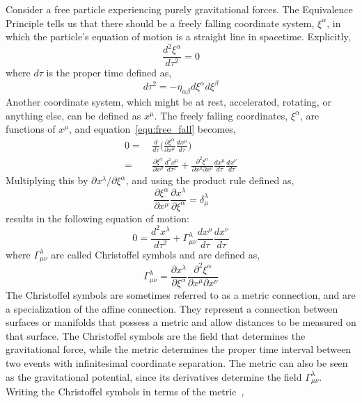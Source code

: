 Consider a free particle experiencing purely gravitational forces. The Equivalence Principle tells us that there should be a freely falling coordinate system, $\xi^{\alpha}$, in which the particle's equation of motion is a straight line in spacetime. Explicitly,
\begin{equation}
\label{equ:free_fall}
    \frac{d^{2}\xi^{\alpha}}{d\tau^{2}} = 0
\end{equation}
where $d\tau$ is the proper time defined as,
\begin{equation}
    d\tau^{2} = -\eta_{\alpha\beta}d\xi^{\alpha}d\xi^{\beta}
\end{equation}
Another coordinate system, which might be at rest, accelerated, rotating, or anything else, can be defined as $x^{\mu}$. The freely falling coordinates, $\xi^{\alpha}$, are functions of $x^{\mu}$, and equation~\ref{equ:free_fall} becomes,
\begin{equation}
    \begin{split}
    0 =& \,\frac{d}{d\tau} \bigg( \frac{\partial\xi^{\alpha}}{\partial x^{\mu}} \frac{dx^{\mu}}{d\tau} \bigg) \\
    =& \,\frac{\partial\xi^{\alpha}}{\partial x^{\mu}} \frac{d^{2}x^{\mu}}{d\tau^{2}} + \frac{\partial^{2}\xi^{\alpha}}{\partial x^{\mu}\partial x^{\nu}} \frac{dx^{\mu}}{d\tau} \frac{dx^{\nu}}{d\tau}
    \end{split}
\end{equation}
Multiplying this by $\partial x^{\lambda}/\partial\xi^{\alpha}$, and using the product rule defined as,
\begin{equation}
    \frac{\partial\xi^{\alpha}}{\partial x^{\mu}} \frac{\partial x^{\lambda}}{\partial\xi^{\alpha}} = \delta^{\lambda}_{\mu}
\end{equation}
results in the following equation of motion:
\begin{equation}
    0 = \frac{d^{2}x^{\lambda}}{d\tau^{2}} + \Gamma^{\lambda}_{\mu\nu} \frac{dx^{\mu}}{d\tau} \frac{dx^{\nu}}{d\tau}
\end{equation}
where $\Gamma^{\lambda}_{\mu\nu}$ are called Christoffel symbols and are defined as,
\begin{equation}
    \Gamma^{\lambda}_{\mu\nu} = \frac{\partial x^{\lambda}}{\partial\xi^{\alpha}} \frac{\partial^{2}\xi^{\alpha}}{\partial x^{\mu}\partial x^{\nu}}
\end{equation}
The Christoffel symbols are sometimes referred to as a metric connection, and are a specialization of the affine connection. They represent a connection between surfaces or manifolds that possess a metric and allow distances to be measured on that surface. The Christoffel symbols are the field that determines the gravitational force, while the metric determines the proper time interval between two events with infinitesimal coordinate separation. The metric can also be seen as the gravitational potential, since its derivatives determine the field $\Gamma^{\lambda}_{\mu\nu}$. Writing the Christoffel symbols in terms of the metric~\cite{schutz_2009, wald},

